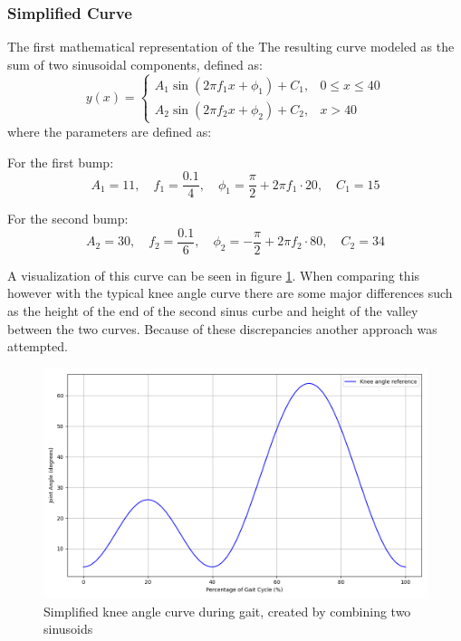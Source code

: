 \subsubsection{Simplified Curve}
The first mathematical representation of the
The resulting curve modeled as the sum of two sinusoidal components, defined as:
\[
y(x) =
\begin{cases}
A_1 \sin\left(2 \pi f_1 x + \phi_1\right) + C_1, & 0 \leq x \leq 40 \\
A_2 \sin\left(2 \pi f_2 x + \phi_2\right) + C_2, & x > 40
\end{cases}
\]
where the parameters are defined as:

For the first bump:
\[
A_1 = 11, \quad f_1 = \frac{0.1}{4}, \quad \phi_1 = \frac{\pi}{2} + 2\pi f_1 \cdot 20, \quad C_1 = 15
\]

For the second bump:
\[
A_2 = 30, \quad f_2 = \frac{0.1}{6}, \quad \phi_2 = -\frac{\pi}{2} + 2\pi f_2 \cdot 80, \quad C_2 = 34
\]


A visualization of this curve can be seen in figure \ref{fig:simplecurve}. When comparing this however with the typical knee angle curve there are some major differences such as the height of the end of the second sinus curbe and height of the valley between the two curves. Because of these discrepancies another approach was attempted.
\begin{figure} [h]
    \centering
    \includegraphics[width=0.8\linewidth]{images/simpleKneeAngle.png}
    \caption{Simplified knee angle curve during gait, created by combining two sinusoids}
    \label{fig:simplecurve}
\end{figure}

